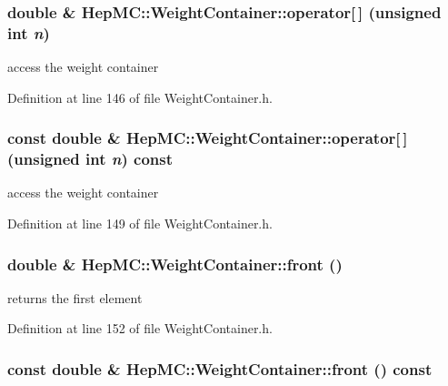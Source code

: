 \subsubsection{\setlength{\rightskip}{0pt plus 5cm}double \& Hep\-MC::Weight\-Container::operator[$\,$] (unsigned int {\em n})\hspace{0.3cm}{\tt  [inline]}}\label{classHepMC_1_1WeightContainer_06a07af2e6d0ba13dbbfeb6d8c6f18c0}


access the weight container 



Definition at line 146 of file Weight\-Container.h.
\subsubsection{\setlength{\rightskip}{0pt plus 5cm}const double \& Hep\-MC::Weight\-Container::operator[$\,$] (unsigned int {\em n}) const\hspace{0.3cm}{\tt  [inline]}}\label{classHepMC_1_1WeightContainer_b72a4a465f5045400544a22e278b1f7b}


access the weight container 



Definition at line 149 of file Weight\-Container.h.
\subsubsection{\setlength{\rightskip}{0pt plus 5cm}double \& Hep\-MC::Weight\-Container::front ()\hspace{0.3cm}{\tt  [inline]}}\label{classHepMC_1_1WeightContainer_2de04e9805d4ce48143608837b487ddf}


returns the first element 



Definition at line 152 of file Weight\-Container.h.
\subsubsection{\setlength{\rightskip}{0pt plus 5cm}const double \& Hep\-MC::Weight\-Container::front () const\hspace{0.3cm}{\tt  [inline]}}\label{classHepMC_1_1WeightContainer_c7f70496f4f90ebd1c5d98ea8e5cff36}


